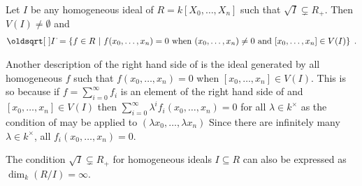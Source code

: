 \documentclass[a4paper,parskip=half,numbers=enddot, DIV=12, headheight=30pt]{scrreprt}
\begin{document}
\begin{prop}
    Let $I$ be any homogeneous ideal of $R=k[X_0,\ldots, X_n]$ such that $\sqrt{I}\subsetneq R_+$. Then $V(I)\neq\emptyset$ and 
    \begin{align}\lbl{eq:projectiveRadical}
        \sqrt{I}= \left\{f\in R\st f(x_0,\ldots, x_n) = 0 \text{ when }(x_0,\ldots,x_n)\neq 0\text{ and } [x_0,\ldots, x_n]\in V(I)\right\}\;.
    \end{align}
\end{prop}
\begin{rem*}
    \begin{alphanumerate}
        \item 
            Another description of the right hand side of  is the ideal generated by all homogeneous $f$ such that $f(x_0,\ldots,x_n)=0$ when $[x_0,\ldots,x_n]\in V(I)$. This is so because if $f= \sum_{i=0}^\infty f_i$ is an element of the right hand side of  and $[x_0,\ldots, x_n]\in V(I)$ then $\sum_{i=0}^\infty \lambda^i f_i(x_0,\ldots,x_n) = 0$ for all $\lambda\in k^\times$ as the condition of  may be applied to $(\lambda x_0,\ldots, \lambda x_n)$ Since there are infinitely many $\lambda\in k^\times$, all $f_i(x_0,\ldots, x_n) = 0$.
        \item 
            The condition $\sqrt{I}\subsetneq R_+$ for homogeneous ideals $I\subseteq R$ can also be expressed as $\dim_k(R/I) = \infty$.
    \end{alphanumerate}
\end{rem*}
\end{document}
